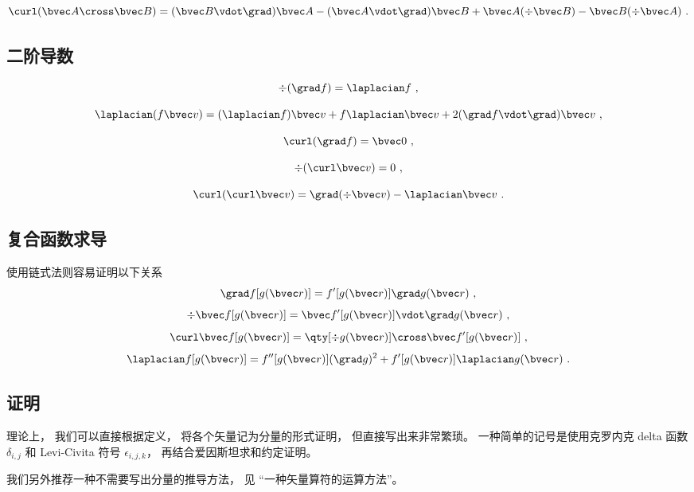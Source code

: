 \begin{equation}\label{eq_VopEq_6}
\curl (\bvec A \cross \bvec B) = (\bvec B \vdot \grad) \bvec A - (\bvec A \vdot \grad) \bvec B + \bvec A (\div \bvec B) - \bvec B (\div \bvec A)~.
\end{equation}

\subsection{二阶导数}

\begin{equation}
\div (\grad f) = \laplacian f~,
\end{equation}

\begin{equation}\label{eq_VopEq_5}
\laplacian (f \bvec v) = (\laplacian f)\bvec v + f \laplacian \bvec v + 2 (\grad f \vdot \grad) \bvec v~,
\end{equation}

\begin{equation}
\curl (\grad f) = \bvec 0~,
\end{equation}

\begin{equation}
\div (\curl \bvec v) = 0~,
\end{equation}

\begin{equation}\label{eq_VopEq_7}
\curl(\curl \bvec v) = \grad(\div\bvec v) - \laplacian \bvec v~.
\end{equation}

\subsection{复合函数求导}
使用链式法则容易证明以下关系
\begin{equation}
\grad f[g(\bvec r)] = f'[g(\bvec r)] \grad g(\bvec r)~,
\end{equation}
\begin{equation}
\div \bvec f[g(\bvec r)] = \bvec f'[g(\bvec r)] \vdot \grad g(\bvec r)~,
\end{equation}
\begin{equation}
\curl \bvec f[g(\bvec r)] = \qty[\div g(\bvec r)] \cross \bvec f'[g(\bvec r)]~,
\end{equation}
\begin{equation}
\laplacian f[g(\bvec r)] = f''[g(\bvec r)] (\grad g)^2 + f'[g(\bvec r)] \laplacian g(\bvec r)~.
\end{equation}

\subsection{证明}
理论上， 我们可以直接根据定义， 将各个矢量记为分量的形式证明， 但直接写出来非常繁琐。 一种简单的记号是使用克罗内克 delta 函数 $\delta_{i,j}$ 和 Levi-Civita 符号 $\epsilon_{i,j,k}$， 再结合爱因斯坦求和约定证明。

我们另外推荐一种不需要写出分量的推导方法， 见 “一种矢量算符的运算方法”。
